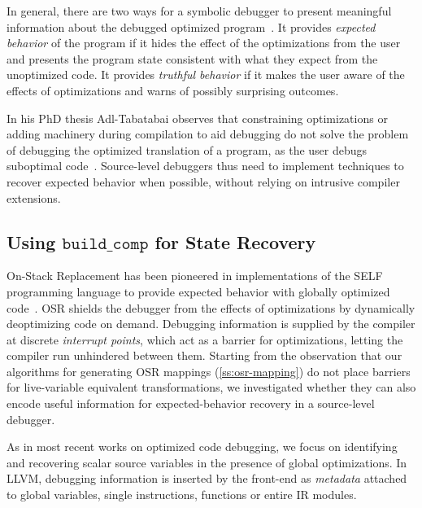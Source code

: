 In general, there are two ways for a symbolic debugger to present meaningful information about the debugged optimized program~\cite{Wu99}. It provides {\em expected behavior} of the program if it hides the effect of the optimizations from the user and presents the program state consistent with what they expect from the unoptimized code. It provides {\em truthful behavior} if it makes the user aware of the effects of optimizations and warns of possibly surprising outcomes.

In his PhD thesis Adl-Tabatabai observes that constraining optimizations or adding machinery during compilation to aid debugging do not solve the problem of debugging the optimized translation of a program, as the user debugs suboptimal code~\cite{Adl-Tabatabai96thesis}. Source-level debuggers thus need to implement techniques to recover expected behavior when possible, without relying on intrusive compiler extensions.

\subsection{Using \texorpdfstring{$\texttt{build\_comp}$}{build\_comp} for State Recovery}
On-Stack Replacement has been pioneered in implementations of the SELF programming language to provide expected behavior with globally optimized code~\cite{Holzle92}. OSR shields the debugger from the effects of optimizations by dynamically deoptimizing code on demand. Debugging information is supplied by the compiler at discrete {\em interrupt points}, which act as a barrier for optimizations, letting the compiler run unhindered between them. Starting from the observation that our algorithms for generating OSR mappings (\mysection\ref{ss:osr-mapping}) do not place barriers for live-variable equivalent transformations, we investigated whether they can also encode useful information for expected-behavior recovery in a source-level debugger.

As in most recent works on optimized code debugging, we focus on identifying and recovering scalar source variables in the presence of global optimizations. In LLVM, debugging information is inserted by the front-end as {\em metadata} attached to global variables, single instructions, functions or entire IR modules.

